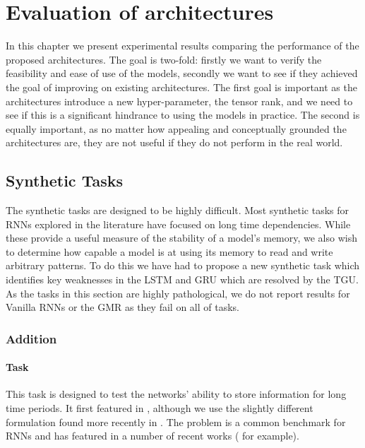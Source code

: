 
\chapter{Evaluation of architectures}\label{C:exps}
In this chapter we present experimental results comparing the performance of the proposed architectures.
The goal is two-fold: firstly we want to verify the feasibility and ease of use of the models, secondly
we want to see if they achieved the goal of improving on existing architectures. The first goal is
important as the architectures introduce a new hyper-parameter, the tensor rank, and we need to see if
this is a significant hindrance to using the models in practice. The second is equally important, as no
matter how appealing and conceptually grounded the architectures are, they are not useful if they do
not perform in the real world.

\section{Synthetic Tasks}
The synthetic tasks are designed to be highly difficult. Most synthetic tasks for RNNs explored in
the literature have focused on long time dependencies. While these provide a useful measure of the
stability of a model's memory, we also wish to determine how capable a model is at using its memory to
read and write arbitrary patterns. To do this we have had to propose a new synthetic task which identifies
key weaknesses in the LSTM and GRU which are resolved by the TGU. As the tasks in this section are
highly pathological, we do not report results for Vanilla RNNs or the GMR as they fail on all of tasks.

\subsection{Addition}\label{sec:addition}
\subsubsection{Task}
This task is designed to test the networks' ability to store information for long time periods. It first
featured in \autocite{Hochreiter1997}, although we use the slightly different formulation found more 
recently in \autocite{Le2015}. The problem is a common benchmark for RNNs and has featured in a number of
recent works (\autocite{Arjovsky2015, Henaff2016, Barone2016, Neyshabur2016} for example).


